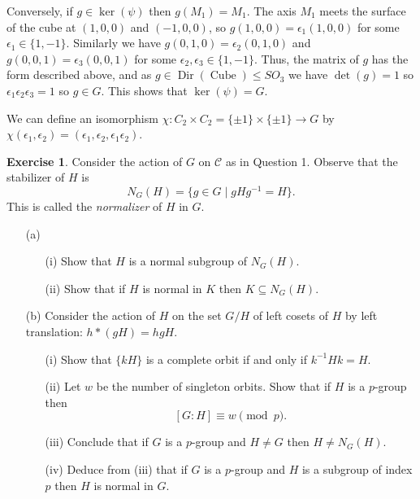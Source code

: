 \documentclass{amsart}
\DeclareMathOperator{\Dir}{Dir}
\DeclareMathOperator{\Cube}{Cube}
\newcommand{\xra}{\xrightarrow}
\renewcommand{\:}{\colon}
\newcommand{\sse}{\subseteq}
\newcommand{\tm}{\times}
\newcommand{\CC}{\mathcal{C}}
\newcommand{\ep}        {\epsilon}
\theoremstyle{definition}
\newtheorem{exercise}{Exercise}
\newenvironment{solution}{{\noindent\bf Solution:}}{}
\begin{document}
\begin{solution}
\begin{itemize}
  Conversely, if $g\in\ker(\psi)$ then $g(M_1)=M_1$.  The axis $M_1$
  meets the surface of the cube at $(1,0,0)$ and $(-1,0,0)$, so
  $g(1,0,0)=\ep_1(1,0,0)$ for some $\ep_1\in\{1,-1\}$.  Similarly we
  have $g(0,1,0)=\ep_2(0,1,0)$ and $g(0,0,1)=\ep_3(0,0,1)$ for some
  $\ep_2,\ep_3\in\{1,-1\}$.  Thus, the matrix of $g$ has the form
  described above, and as $g\in\Dir(\Cube)\leq SO_3$ we have
  $\det(g)=1$ so $\ep_1\ep_2\ep_3=1$ so $g\in G$.  This shows that
  $\ker(\psi)=G$.  

  We can define an isomorphism
  $\chi\:C_2\tm C_2=\{\pm 1\}\tm\{\pm 1\}\xra{}G$ by
  $\chi(\ep_1,\ep_2)=(\ep_1,\ep_2,\ep_1\ep_2)$. 
 \end{itemize}
\end{solution}

\begin{exercise}
 Consider the action of $G$ on $\CC$ as in Question 1.
 Observe that the stabilizer of $H$ is
 \[ N_G(H)=\{ g \in G\; |\; gHg^{-1}=H\}. \]
 This is called the {\em normalizer} of $H$ in $G$.

 \begin{itemize}
 \item[(a)] 
  \begin{itemize}
  \item[(i)] Show that $H$ is a normal subgroup of $N_G(H)$.
  \item[(ii)] Show that if $H$ is normal in $K$ then $K\sse N_G(H)$.
  \end{itemize}
 \item[(b)] Consider the action of $H$ on the set $G/H$ of left cosets
  of $H$ by left translation: $h*(gH)=hgH$.
  \begin{itemize}
  \item[(i)] Show that $\{kH\} $ is a complete orbit if and only if
   $k^{-1}Hk=H$.
  \item[(ii)] Let $w$ be the number of singleton orbits.  Show that if
   $H$ is a $p$-group then
   \[ [G:H] \equiv w \pmod{p} . \]
  \item[(iii)] Conclude that if $G$ is a $p$-group and $H \neq G$ then
   $H\neq N_G(H)$.
  \item[(iv)] Deduce from (iii) that if $G$ is a $p$-group and $H$ is a
   subgroup of index $p$ then $H$ is normal in $G$.
  \end{itemize}
 \end{itemize}
\end{exercise}
\begin{solution}

\end{solution}
\end{document}

